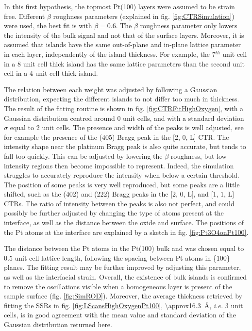 In this first hypothesis, the topmost Pt(100) layers were assumed to be strain free.
Different $\beta$ roughness parameters (explained in fig. \ref{fig:CTRSimulation}) were used, the best fit is with $\beta = \num{0.6}$.
The $\beta$ roughness parameter only lowers the intensity of the bulk signal and not that of the surface layers.
Moreover, it is assumed that  islands have the same out-of-plane and in-plane lattice parameter in each layer, independently of the island thickness.
For example, the 7$^{th}$ unit cell in a \num{8} unit cell thick island has the same lattice parameters than the second unit cell in a \num{4} unit cell thick island.

The relation between each weight was adjusted by following a Gaussian distribution, expecting the different islands to not differ too much in thickness.
The result of the fitting routine is shown in fig. \ref{fig:CTRFitHighOxygen}, with a Gaussian distribution centred around $0$ unit cells, and with a standard deviation $\sigma$ equal to $2$ unit cells.
The presence and width of the  peaks is well adjusted, see for example the presence of the (405)  Bragg peak in the [2, 0, L] CTR.
The intensity shape near the platinum Bragg peak is also quite accurate, but tends to fall too quickly.
This can be adjusted by lowering the $\beta$ roughness, but low intensity regions then become impossible to represent.
Indeed, the simulation struggles to accurately reproduce the intensity when below a certain threshold.
The position of some peaks is very well reproduced, but some peaks are a little shifted, such as the (402) and (2$\bar{2}2$)  Bragg peaks in the [2, 0, L], and [1, $\bar{1}$, L] CTRs.
The ratio of intensity between the  peaks is also not perfect, and could possibly be further adjusted by changing the type of atoms present at the interface, as well as the distance between the oxide and surface.
The positions of the Pt atoms at the interface are explained by a sketch in fig. \ref{fig:Pt3O4onPt100}.

The distance between the Pt atoms in the Pt(100) bulk and  was chosen equal to \num{0.5} unit cell lattice length, following the spacing between Pt atoms in \{100\} planes.
The fitting result may be further improved by adjusting this parameter, as well as the interfacial strain.
Overall, the existence of bulk  islands is confirmed to remove the oscillations visible when a homogeneous layer is present of the sample surface (fig. \ref{fig:SimROD}).
Moreover, the average thickness retrieved by fitting the SSRs in fig. \ref{fig:LScansHighOxygenPt100}, \qty{\approx16.3}{\angstrom}, \textit{i.e.} 3 unit cells, is in good agreement with the mean value and standard deviation of the Gaussian distribution returned here.

